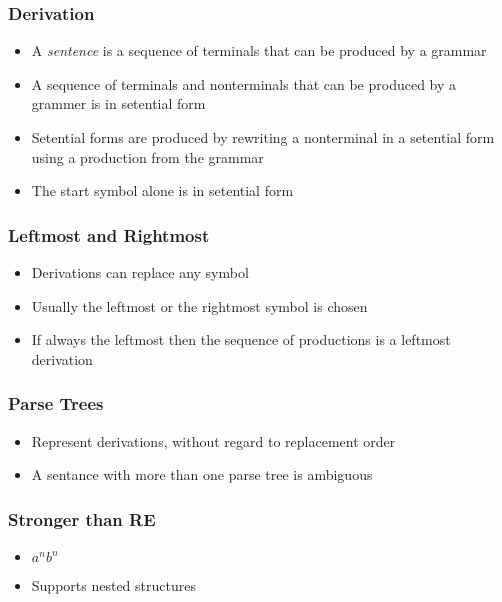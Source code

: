 \documentclass[usepdftitle=false,professionalfonts,compress ]{beamer}
\begin{document}
{
\begin{frame}\frametitle{Derivation}

	\begin{itemize}
	\item A \textit{sentence} is a sequence of terminals that can be produced by a grammar
			\item A sequence of terminals and nonterminals that can be produced by a grammer is in setential form
			\item Setential forms are produced by rewriting a nonterminal in a setential form using a production from the grammar
			\item The start symbol alone is in setential form
				\end{itemize}

\end{frame}}






{
\begin{frame}\frametitle{Leftmost and Rightmost}

	\begin{itemize}
	\item Derivations can replace any symbol
			\item Usually the leftmost or the rightmost symbol is chosen
			\item If always the leftmost then the sequence of productions is a leftmost derivation
				\end{itemize}

\end{frame}}





{
\begin{frame}\frametitle{Parse Trees}

	\begin{itemize}
	\item Represent derivations, without regard to replacement order
			\item A sentance with more than one parse tree is ambiguous
				\end{itemize}

\end{frame}}




{
\begin{frame}\frametitle{Stronger than RE}

	\begin{itemize}
	\item $a^nb^n$
			\item Supports nested structures
				\end{itemize}

\end{frame}}
\end{document}
